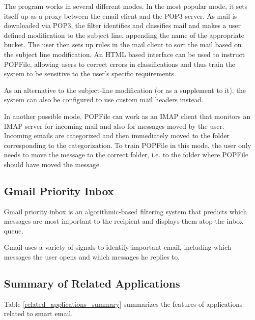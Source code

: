 The program works in several different modes. In the most popular mode, it sets itself up as a proxy between the email client and the POP3 server. As mail is downloaded via POP3, the filter identifies and classifies mail and makes a user defined modification to the subject line, appending the name of the appropriate bucket. The user then sets up rules in the mail client to sort the mail based on the subject line modification. An HTML based interface can be used to instruct POPFile, allowing users to correct errors in classifications and thus train the system to be sensitive to the user's specific requirements.

As an alternative to the subject-line modification (or as a supplement to it), the system can also be configured to use custom mail headers instead.

In another possible mode, POPFile can work as an IMAP client that monitors an IMAP server for incoming mail and also for messages moved by the user. Incoming emails are categorized and then immediately moved to the folder corresponding to the categorization. To train POPFile in this mode, the user only needs to move the message to the correct folder, i.e. to the folder where POPFile should have moved the message.

\subsection{Gmail Priority Inbox}
Gmail priority inbox is an algorithmic-based filtering system that predicts which messages are most important to the recipient and displays them atop the inbox queue.

Gmail uses a variety of signals to identify important email, including which messages the user opens and which messages he replies to.

\subsection{Summary of Related Applications}
Table \ref{related_applications_summary} summarizes the features of applications related to smart email.

